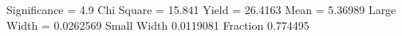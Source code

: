 Significance = 4.9
Chi Square = 15.841
Yield = 26.4163
Mean = 5.36989
Large Width = 0.0262569
Small Width 0.0119081
Fraction 0.774495
